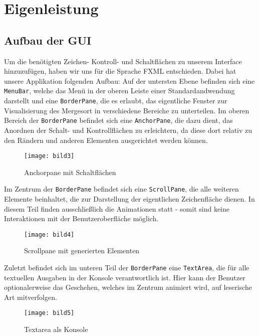 
\chapter{Eigenleistung}\label{chap:eigenleistung}

\section{Aufbau der GUI}
Um die benötigten Zeichen- Kontroll- und Schaltflächen zu unserem Interface hinzuzufügen, haben wir uns für die Sprache
FXML entschieden. Dabei hat unsere Applikation folgenden Aufbau:
Auf der untersten Ebene befinden sich eine \texttt{MenuBar}, welche das Menü in der oberen Leiste
einer Standardandwendung darstellt und eine \texttt{BorderPane}, die es erlaubt, das eigentliche
Fenster zur Visualisierung des Mergesort in verschiedene Bereiche zu unterteilen. Im oberen Bereich der \texttt{BorderPane}
befindet sich eine \texttt{AnchorPane}, die dazu dient, das Anordnen der Schalt- und Kontrollflächen zu erleichtern, da diese dort
relativ zu den Rändern und anderen Elementen ausgerichtet werden können.


\begin{figure}[!htb]
    \centering
      \texttt{[image: bild3]}
    \caption{Anchorpane mit Schaltflächen}
\end{figure}

Im Zentrum der \texttt{BorderPane} befindet sich eine \texttt{ScrollPane}, die alle weiteren Elemente beinhaltet,
die zur Darstellung der eigentlichen Zeichenfläche dienen. In diesem Teil finden ausschließlich die Animationen statt - somit sind keine Interaktionen mit der
Benutzeroberfläche möglich.

\begin{figure}[!htb]
    \centering
      \texttt{[image: bild4]}
    \caption{Scrollpane mit generierten Elementen}
\end{figure}

Zuletzt befindet sich im unteren Teil der \texttt{BorderPane} eine \texttt{TextArea}, die für alle textuellen Ausgaben in der Konsole
verantwortlich ist. Hier kann der Benutzer optionalerweise das Geschehen, welches im Zentrum animiert wird,
auf leserische Art mitverfolgen.

\begin{figure}[!htb]
    \centering
      \texttt{[image: bild5]}
    \caption{Textarea als Konsole}
\end{figure}

